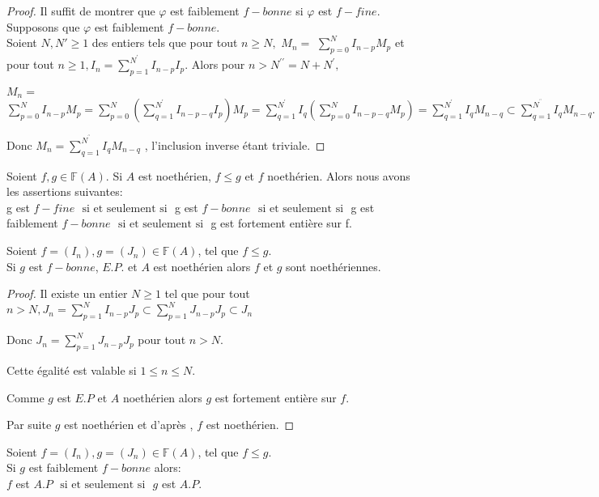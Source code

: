 \begin{proof}
	Il suffit de montrer que $\varphi$ est faiblement $f-bonne$ si $\varphi$ est $f-fine$.\\ Supposons que $\varphi$ est faiblement $f-bonne$.\\
	Soient $N, N' \geqslant 1$ des entiers tels que pour tout $n \geqslant N,$
	$M_{n}=$ $\sum\limits_{p=0}^{N}I_{n-p}M_{p}$ et pour tout $n\geq
	1,I_{n}=\sum\limits_{p=1}^{N^{\prime }}I_{n-p}I_{p}.$ Alors pour $n>N^{\prime \prime }=N+N^{\prime},$
	
	$M_{n}=$ $\sum\limits_{p=0}^{N}I_{n-p}M_{p}=\sum\limits_{p=0}^{N}(
	\sum\limits_{q=1}^{N^{\prime}}I_{n-p-q}I_{p})M_{p}=\sum\limits_{q=1}^{N^{\prime}}I_{q}(\sum\limits_{p=0}^{N}I_{n-p-q}M_{p})=\sum\limits_{q=1}^{N^{\prime}}I_{q}M_{n-q}\subset\sum\limits_{q=1}^{N^{^{\prime \prime }}}I_{q}M_{n-q}.$
	
	Donc $M_{n}=\sum\limits_{q=1}^{N^{^{\prime \prime }}}I_{q}M_{n-q}$ ,
	l'inclusion inverse étant triviale. 
\end{proof}
\begin{moncorollaire}
	\label{maprop9}
	Soient $f,g \in \mathbb{F}(A)$. Si $A$ est noethérien, $f \leqslant g$ et $f$ noethérien. Alors nous avons les assertions suivantes:\\
	g est $f-fine$ $\text{ si et seulement si }$  g est $f-bonne$ $\text{ si et seulement si }$  g est faiblement $f-bonne$ $\text{ si et seulement si }$  g est fortement entière sur f.
\end{moncorollaire}
\begin{maproposition}
	Soient $f=(I_n), g=(J_n) \in \mathbb{F}(A)$, tel que $f \leqslant g$.\\ Si $g$ est $f-bonne$, $E.P.$ et $A$ est noethérien alors $f$ et $g$ sont noethériennes.
\end{maproposition}
\begin{proof}
	Il existe un entier $N\geq 1$ tel que pour tout $n>N,J_{n}=\sum
	\limits_{p=1}^{N}I_{n-p}J_{p}\subset
	\sum\limits_{p=1}^{N}J_{n-p}J_{p}\subset J_{n}$
	
	Donc $J_{n}=\sum\limits_{p=1}^{N}J_{n-p}J_{p}$ pour tout $n>N.$
	
	Cette égalité est valable si $1\leq n\leq N.$
	
	Comme $g$ est $E.P$ et $A$ noethérien alors $g$ est fortement entière sur $f.$ 
	
	Par suite $g$ est noethérien et d'après \cite{Eak}, $f$ est noethérien. 
\end{proof}
\begin{maproposition}
	Soient $f=(I_n), g=(J_n) \in \mathbb{F}(A)$, tel que $f \leqslant g$.\\Si $g$ est faiblement $f-bonne$ alors:\\ $f$ est $A.P$ $\text{ si et seulement si }$ $g$ est $A.P$.
\end{maproposition}
